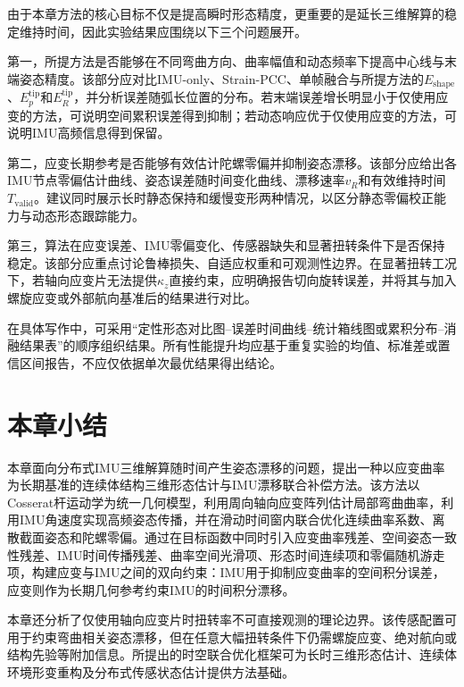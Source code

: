 由于本章方法的核心目标不仅是提高瞬时形态精度，更重要的是延长三维解算的稳定维持时间，因此实验结果应围绕以下三个问题展开。

第一，所提方法是否能够在不同弯曲方向、曲率幅值和动态频率下提高中心线与末端姿态精度。该部分应对比IMU-only、Strain-PCC、单帧融合与所提方法的$E_{\mathrm{shape}}$、$E_p^{\mathrm{tip}}$和$E_R^{\mathrm{tip}}$，并分析误差随弧长位置的分布。若末端误差增长明显小于仅使用应变的方法，可说明空间累积误差得到抑制；若动态响应优于仅使用应变的方法，可说明IMU高频信息得到保留。

第二，应变长期参考是否能够有效估计陀螺零偏并抑制姿态漂移。该部分应给出各IMU节点零偏估计曲线、姿态误差随时间变化曲线、漂移速率$v_R$和有效维持时间$T_{\mathrm{valid}}$。建议同时展示长时静态保持和缓慢变形两种情况，以区分静态零偏校正能力与动态形态跟踪能力。

第三，算法在应变误差、IMU零偏变化、传感器缺失和显著扭转条件下是否保持稳定。该部分应重点讨论鲁棒损失、自适应权重和可观测性边界。在显著扭转工况下，若轴向应变片无法提供$\kappa_z$直接约束，应明确报告切向旋转误差，并将其与加入螺旋应变或外部航向基准后的结果进行对比。

在具体写作中，可采用“定性形态对比图--误差时间曲线--统计箱线图或累积分布--消融结果表”的顺序组织结果。所有性能提升均应基于重复实验的均值、标准差或置信区间报告，不应仅依据单次最优结果得出结论。

\section{本章小结}
\label{sec:shape_drift_summary}

本章面向分布式IMU三维解算随时间产生姿态漂移的问题，提出一种以应变曲率为长期基准的连续体结构三维形态估计与IMU漂移联合补偿方法。该方法以Cosserat杆运动学为统一几何模型，利用周向轴向应变阵列估计局部弯曲曲率，利用IMU角速度实现高频姿态传播，并在滑动时间窗内联合优化连续曲率系数、离散截面姿态和陀螺零偏。通过在目标函数中同时引入应变曲率残差、空间姿态一致性残差、IMU时间传播残差、曲率空间光滑项、形态时间连续项和零偏随机游走项，构建应变与IMU之间的双向约束：IMU用于抑制应变曲率的空间积分误差，应变则作为长期几何参考约束IMU的时间积分漂移。

本章还分析了仅使用轴向应变片时扭转率不可直接观测的理论边界。该传感配置可用于约束弯曲相关姿态漂移，但在任意大幅扭转条件下仍需螺旋应变、绝对航向或结构先验等附加信息。所提出的时空联合优化框架可为长时三维形态估计、连续体环境形变重构及分布式传感状态估计提供方法基础。
